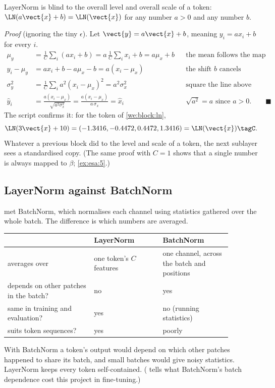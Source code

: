 \begin{keypoint}
LayerNorm is blind to the overall level and overall scale of a token: $\LN(a\vect{x} + b) =
\LN(\vect{x})$ for any number $a > 0$ and any number $b$.
\end{keypoint}

\emph{Proof} (ignoring the tiny $\epsilon$). Let $\vect{y} = a\vect{x} + b$, meaning
$y_i = a x_i + b$ for every $i$.
\begin{align*}
  \mu_y &= \frac{1}{C}\sum_i (a x_i + b) = a\,\frac{1}{C}\sum_i x_i + b = a\mu_x + b && \text{the mean follows the map}\\
  y_i - \mu_y &= a x_i + b - a\mu_x - b = a(x_i - \mu_x) && \text{the shift } b \text{ cancels}\\
  \sigma_y^2 &= \frac{1}{C}\sum_i a^2(x_i - \mu_x)^2 = a^2\sigma_x^2 && \text{square the line above}\\
  \hat y_i &= \frac{a(x_i - \mu_x)}{\sqrt{a^2\sigma_x^2}} = \frac{a(x_i - \mu_x)}{a\,\sigma_x} = \hat x_i && \sqrt{a^2} = a \text{ since } a > 0. \qquad\blacksquare
\end{align*}
The script confirms it: for the token of \cref{we:block:ln},
\[
  \LN(3\vect{x} + 10) = (-1.3416, -0.4472, 0.4472, 1.3416) = \LN(\vect{x})\tagC .
\] Whatever a previous block did to the level and scale
of a token, the next sublayer sees a standardised copy. (The same proof with $C = 1$ shows that a
single number is always mapped to $\beta$; \cref{ex:esa:5}.)

\subsection{LayerNorm against BatchNorm}

 met BatchNorm, which normalises each channel using
statistics gathered over the whole batch. The difference is which numbers are averaged.

\begin{center}
\begin{tabular}{p{0.34\linewidth}p{0.27\linewidth}p{0.27\linewidth}}
\toprule
 & LayerNorm & BatchNorm\\
\midrule
averages over & one token's $C$ features & one channel, across the batch and positions\\
depends on other patches in the batch? & no & yes\\
same in training and evaluation? & yes & no (running statistics)\\
suits token sequences? & yes & poorly\\
\bottomrule
\end{tabular}
\end{center}
With BatchNorm a token's output would depend on which other patches happened to share its batch,
and small batches would give noisy statistics. LayerNorm keeps every token self-contained.
( tells what BatchNorm's batch dependence cost this project in fine-tuning.)

